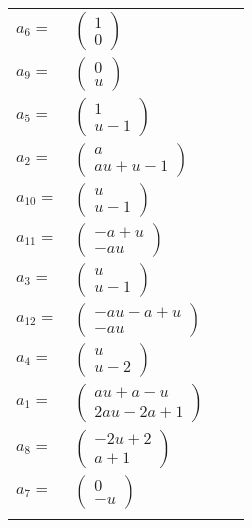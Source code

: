 \documentclass[1p]{elsarticle_modified}
\theoremstyle{definition}
\begin{document}
\begin{tabular}{m{7pt} m{180pt} m{7pt} m{180pt} }
\flushright $a_{6}=$&$\begin{pmatrix}1\\0\end{pmatrix}$ \\
\flushright $a_{9}=$&$\begin{pmatrix}0\\u\end{pmatrix}$ \\
\flushright $a_{5}=$&$\begin{pmatrix}1\\u-1\end{pmatrix}$ \\
\flushright $a_{2}=$&$\begin{pmatrix}a\\a u+u-1\end{pmatrix}$ \\
\flushright $a_{10}=$&$\begin{pmatrix}u\\u-1\end{pmatrix}$ \\
\flushright $a_{11}=$&$\begin{pmatrix}- a+u\\- a u\end{pmatrix}$ \\
\flushright $a_{3}=$&$\begin{pmatrix}u\\u-1\end{pmatrix}$ \\
\flushright $a_{12}=$&$\begin{pmatrix}- a u- a+u\\- a u\end{pmatrix}$ \\
\flushright $a_{4}=$&$\begin{pmatrix}u\\u-2\end{pmatrix}$ \\
\flushright $a_{1}=$&$\begin{pmatrix}a u+a- u\\2 a u-2 a+1\end{pmatrix}$ \\
\flushright $a_{8}=$&$\begin{pmatrix}-2 u+2\\a+1\end{pmatrix}$ \\
\flushright $a_{7}=$&$\begin{pmatrix}0\\- u\end{pmatrix}$\\&\end{tabular}
\end{document}
